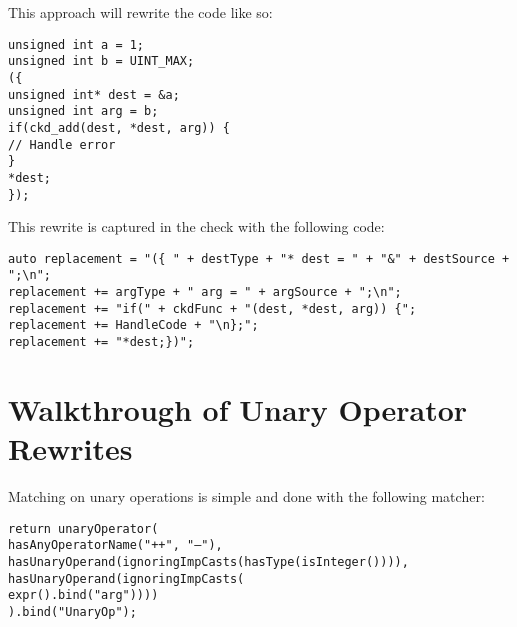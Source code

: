 This approach will rewrite the code like so:
\begin{center}
\parbox{0.8\linewidth}{
\texttt{unsigned int a = 1;\\
unsigned int b = UINT\_MAX;\\
(\{\\
\hspace*{2em}unsigned int* dest = \&a;\\
\hspace*{2em}unsigned int arg = b;\\
\hspace*{2em}if(ckd\_add(dest, *dest, arg)) \{\\
\hspace*{4em}// Handle error\\
\hspace*{2em}\}\\
\hspace*{2em}*dest;\\
\});}
}
\end{center}

This rewrite is captured in the check with the following code:
\begin{center}
\parbox{0.99\linewidth}{
\texttt{auto replacement = "(\{ " + destType + "* dest = " + "\&" + destSource + ";\textbackslash n";\\
replacement += argType + " arg = " + argSource + ";\textbackslash n";\\
replacement += "if(" + ckdFunc + "(dest, *dest, arg)) \{";\\
replacement += HandleCode + "\textbackslash n\};";\\
replacement += "*dest;\})";}
}
\end{center}

\section{Walkthrough of Unary Operator Rewrites}

Matching on unary operations is simple and done with the following matcher:
\begin{center}
\parbox{0.9\linewidth}{
\texttt{return unaryOperator(\\
\hspace*{2em}hasAnyOperatorName("++", "--"),\\
\hspace*{2em}hasUnaryOperand(ignoringImpCasts(hasType(isInteger()))),\\
\hspace*{2em}hasUnaryOperand(ignoringImpCasts(\\
\hspace*{4em}expr().bind("arg"))))\\
).bind("UnaryOp");}
}
\end{center}

